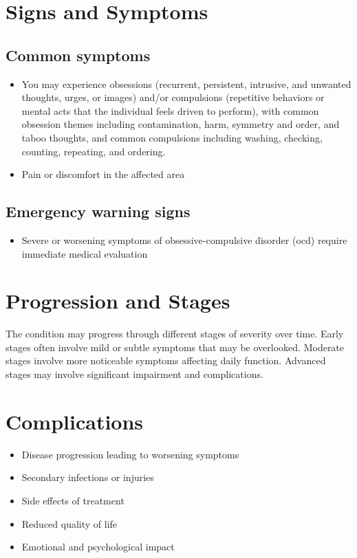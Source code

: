 \section{Signs and Symptoms}
\subsection{Common symptoms}
\begin{itemize}[noitemsep]
  \item You may experience obsessions (recurrent, persistent, intrusive, and unwanted thoughts, urges, or images) and/or compulsions (repetitive behaviors or mental acts that the individual feels driven to perform), with common obsession themes including contamination, harm, symmetry and order, and taboo thoughts, and common compulsions including washing, checking, counting, repeating, and ordering.
  \item Pain or discomfort in the affected area
  \end{itemize}
\subsection{Emergency warning signs}
\begin{itemize}[noitemsep]
  \item Severe or worsening symptoms of obsessive-compulsive disorder (ocd) require immediate medical evaluation
\end{itemize}
\section{Progression and Stages}
The condition may progress through different stages of severity over time. Early stages often involve mild or subtle symptoms that may be overlooked. Moderate stages involve more noticeable symptoms affecting daily function. Advanced stages may involve significant impairment and complications.
\section{Complications}
\begin{itemize}[noitemsep]
  \item Disease progression leading to worsening symptoms
  \item Secondary infections or injuries
  \item Side effects of treatment
  \item Reduced quality of life
  \item Emotional and psychological impact
\end{itemize}
